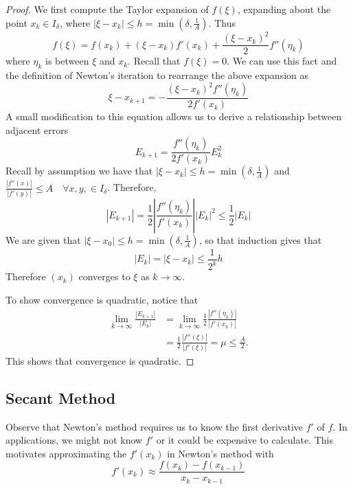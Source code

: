 \documentclass[12pt]{article}
\theoremstyle{definition}
\theoremstyle{definition}
\begin{document}
\begin{proof}
We first compute the Taylor expansion of $f(\xi)$, expanding about the point $x_k \in I_\delta$, where $|\xi - x_k| \leq h = \min(\delta, \frac{1}{A})$. Thus
\begin{equation}
	f(\xi) = f(x_k) + (\xi - x_k)f'(x_k) + \frac{(\xi - x_k)^2}{2} f''(\eta_k)
\end{equation}
where $\eta_k$ is between $\xi$ and $x_k$. Recall that $f(\xi) = 0$. We can use this fact and the definition of Newton's iteration to rearrange the above expansion as
\begin{equation}
	\xi - x_{k+1} = - \frac{(\xi - x_k)^2 f''(\eta_k) }{2f'(x_k)}
\end{equation}
A small modification to this equation allows us to derive a relationship between adjacent errors
\begin{equation}
	E_{k+1} = \frac{f''(\eta_k)}{2f'(x_k)} E_k^2
\end{equation}
Recall by assumption we have that $|\xi - x_k| \leq h = \min(\delta, \frac{1}{A})$ and $\frac{|f''(x)|}{|f'(y)|} \leq A \quad \forall x,y, \in I_\delta$. Therefore, 
\begin{equation}
 	|E_{k+1}| = \frac{1}{2} \left\vert \frac{f''(\eta_k)}{f'(x_k)} \right\vert |E_k|^2 \leq \frac{1}{2} |E_k|
\end{equation} 
We are given that $|\xi - x_0| \leq h = \min(\delta, \frac{1}{A})$, so that induction gives that 
\begin{equation}
	|E_k| = |\xi - x_k| \leq \frac{1}{2^k} h
\end{equation}
Therefore $(x_k)$ converges to $\xi$ as $k \to \infty$. 


To show convergence is quadratic, notice that
\begin{align*}
	\lim_{k \to \infty} \frac{|E_{k+1}|}{|E_k|} &= \lim_{k \to \infty} \frac{1}{2} \frac{|f''(\eta_k)|}{|f'(x_k)|} \\
	&= \frac{1}{2} \frac{|f''(\xi)|}{|f'(\xi)|} = \mu \leq \frac{A}{2}. 
\end{align*}
This shows that convergence is quadratic. 
\end{proof}

\subsection{Secant Method}
Observe that Newton's method requires us to know the first derivative $f'$ of $f$. In applications, we might not know $f'$ or it could be expensive to calculate. This motivates approximating the $f'(x_k)$ in Newton's method with
\begin{equation}
	f'(x_k) \approx \frac{f(x_k) - f(x_{k-1})}{x_k - x_{k-1}}
\end{equation}
\end{document}
